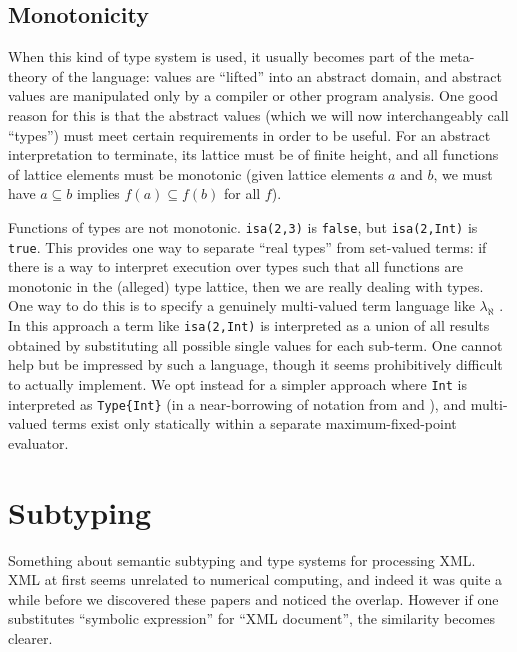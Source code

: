 \subsection{Monotonicity}

When this kind of type system is used, it usually becomes part of the
meta-theory of the language: values are ``lifted'' into an abstract
domain, and abstract values are manipulated only by a compiler
or other program analysis.
One good reason for this is that the abstract values (which we will
now interchangeably call ``types'') must meet certain requirements in
order to be useful.
For an abstract interpretation to terminate, its lattice must be of
finite height, and all functions of lattice elements must be
monotonic (given lattice elements $a$ and $b$, we must have
$a\subseteq b$ implies $f(a)\subseteq f(b)$ for all $f$).


Functions of types are not monotonic. \texttt{isa(2,3)} is \texttt{false},
but \texttt{isa(2,Int)} is \texttt{true}.
This provides one way to separate ``real types'' from set-valued terms:
if there is a way to interpret execution over types such that all functions
are monotonic in the (alleged) type lattice, then we are really dealing
with types.
One way to do this is to specify a genuinely multi-valued term language
like $\lambda_\aleph$ \cite{Glew:2013:MLD:2502409.2502412}.
In this approach a term like \texttt{isa(2,Int)} is interpreted as a
union of all results obtained by substituting all possible single values
for each sub-term. One cannot help but be impressed by such a language,
though it seems prohibitively difficult to actually implement.
We opt instead for a simpler approach where \texttt{Int} is
interpreted as \texttt{Type\{Int\}} (in a near-borrowing of notation from
\cite{Glew:2013:MLD:2502409.2502412} and \cite{cardelli1986polymorphic}),
and multi-valued terms exist only statically within a separate
maximum-fixed-point evaluator.

\section{Subtyping}

Something about semantic subtyping and type systems for processing XML.
XML at first seems unrelated to numerical computing, and indeed it
was quite a while before we discovered these papers and noticed the
overlap. However if one substitutes ``symbolic expression'' for
``XML document'', the similarity becomes clearer.

